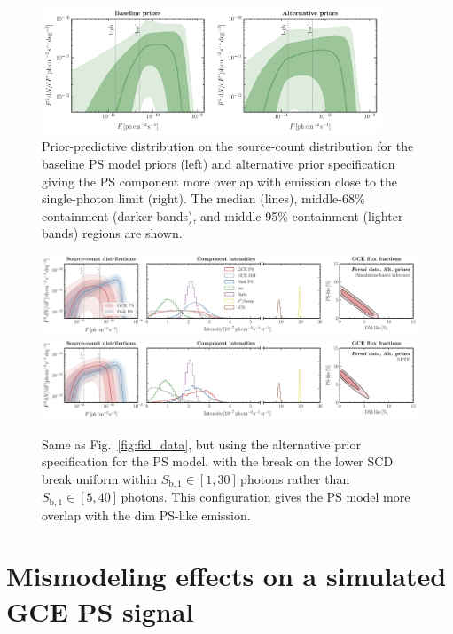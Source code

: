 \documentclass[prd,aps,10pt,nofootinbib,twocolumn,superscriptaddress,preprintnumbers,balancelastpage,longbibliography,floatfix]{revtex4-2}
\begin{document}
%
\begin{figure}[!t]
\centering
\includegraphics[width=0.9\textwidth]{pp_check.pdf}
\caption{Prior-predictive distribution on the source-count distribution for the baseline PS model priors (left) and alternative prior specification giving the PS component more overlap with emission close to the single-photon limit (right). The median (lines), middle-68\% containment (darker bands), and middle-95\% containment (lighter bands) regions are shown.}
\label{fig:pp_check}
\end{figure}
%

%
\begin{figure}[!t]
\centering
\includegraphics[width=1.\textwidth]{data_fid_sbi_new_ps_priors.pdf}
\includegraphics[width=1.\textwidth]{data_fid_nptf_new_ps_priors.pdf}
\caption{Same as Fig.~\ref{fig:fid_data}, but using the alternative prior specification for the PS model, with the break on the lower SCD break uniform within $S_{\mathrm{b}, 1}  \in  [1, 30]$\,photons rather than $S_{\mathrm{b}, 1}  \in  [5, 40]$\,photons. This configuration gives the PS model more overlap with the dim PS-like emission.}
\label{fig:fid_data_alt_priors}
\end{figure}
%

\section{Mismodeling effects on a simulated GCE PS signal}
\label{app:mismodeling_ps}
\end{document}

